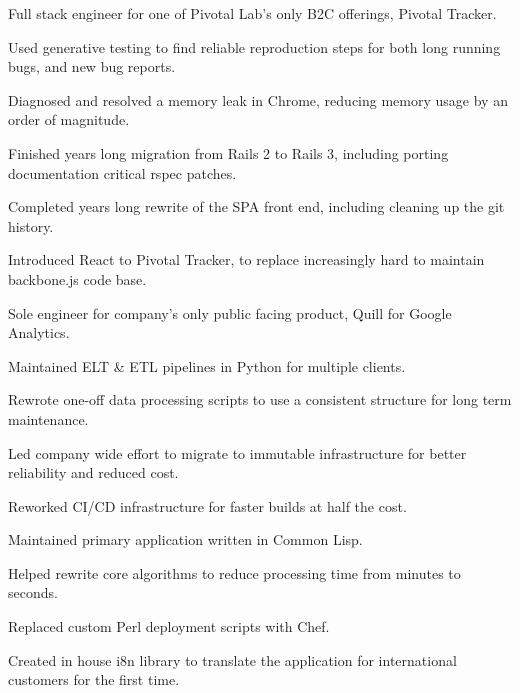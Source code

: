 \documentclass[]{deedy-resume-openfont}
\begin{document}
\vspace{\topsep}
Full stack engineer for one of Pivotal Lab's only B2C offerings, Pivotal Tracker.
\vspace{\topsep}
\begin{tightemize}
\item Used generative testing to find reliable reproduction steps for both long running bugs, and new bug reports.
\item Diagnosed and resolved a memory leak in Chrome, reducing memory usage by an order of magnitude.
\item Finished years long migration from Rails 2 to Rails 3, including porting documentation critical rspec patches.
\item Completed years long rewrite of the SPA front end, including cleaning up the git history.
\item Introduced React to Pivotal Tracker, to replace increasingly hard to maintain backbone.js code base.
\end{tightemize}

\sectionsep
{}
\vspace{\topsep}
\begin{tightemize}
\item Sole engineer for company's only public facing product, Quill for Google Analytics.
\item Maintained ELT \& ETL pipelines in Python for multiple clients.
\item Rewrote one-off data processing scripts to use a consistent structure for long term maintenance.
\item Led company wide effort to migrate to immutable infrastructure for better reliability and reduced cost.
\item Reworked CI/CD infrastructure for faster builds at half the cost.
\end{tightemize}

\sectionsep
{}
\vspace{\topsep}
\begin{tightemize}
\item Maintained primary application written in Common Lisp.
\item Helped rewrite core algorithms to reduce processing time from minutes to seconds.
\item Replaced custom Perl deployment scripts with Chef.
\item Created in house i8n library to translate the application for international customers for the first time.
\end{tightemize}
\end{document}
